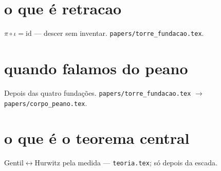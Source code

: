 \documentclass[11pt,a4paper]{article}
\newcommand{\code}[1]{\texttt{\small #1}}
\begin{document}
\section{o que é retracao}
$\pi\circ\iota=\mathrm{id}$ --- descer sem inventar.
\code{papers/torre\_fundacao.tex}.

\section{quando falamos do peano}
Depois das quatro fundações.
\code{papers/torre\_fundacao.tex} $\to$ \code{papers/corpo\_peano.tex}.

\section{o que é o teorema central}
Gentil$\leftrightarrow$Hurwitz pela medida --- \code{teoria.tex}; só depois da escada.
\end{document}
